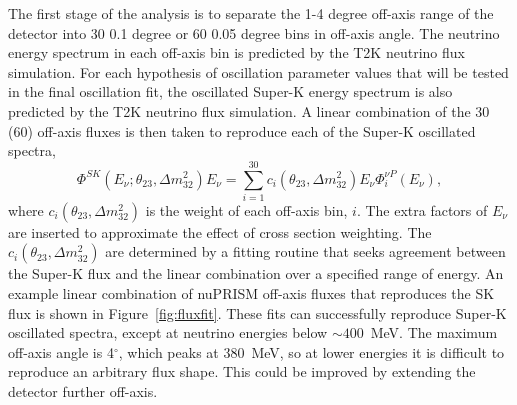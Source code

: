 The first stage of the \nuprismlite \numu analysis is to separate the 1-4 degree off-axis range of the detector into 30 0.1 degree or 60 0.05 degree bins in off-axis angle. The neutrino energy spectrum in each off-axis bin is predicted by the T2K neutrino flux simulation.  For each hypothesis of oscillation parameter values that will be tested in the final oscillation fit, the oscillated Super-K energy spectrum is also predicted by the T2K neutrino flux simulation. A linear combination of the 30 (60) off-axis fluxes is then taken to reproduce each of the Super-K oscillated spectra,
\begin{equation}
\Phi^{SK} \left(E_\nu;\theta_{23},\Delta m^2_{32}\right)E_\nu =\sum_{i=1}^{30}c_i\left(\theta_{23},\Delta m^2_{32}\right)E_\nu\Phi^{\nu P}_i(E_\nu),
\end{equation}
where $c_i\left(\theta_{23},\Delta m^2_{32}\right)$ is the weight of each off-axis bin, $i$. The extra factors of $E_\nu$ are inserted to approximate the effect of cross section weighting. The $c_i\left(\theta_{23},\Delta m^2_{32}\right)$ are determined by a fitting routine that seeks agreement between the Super-K flux and the linear combination over a specified range of energy. An example linear combination of nuPRISM off-axis fluxes that reproduces the SK flux is shown in Figure~\ref{fig:fluxfit}. These fits can successfully reproduce Super-K oscillated spectra, except at neutrino energies below $\sim 400$~MeV. The maximum off-axis angle is 4$^\circ$, which peaks at 380~MeV, so at lower energies it is difficult to reproduce an arbitrary flux shape. This could be improved by extending the detector further off-axis.

